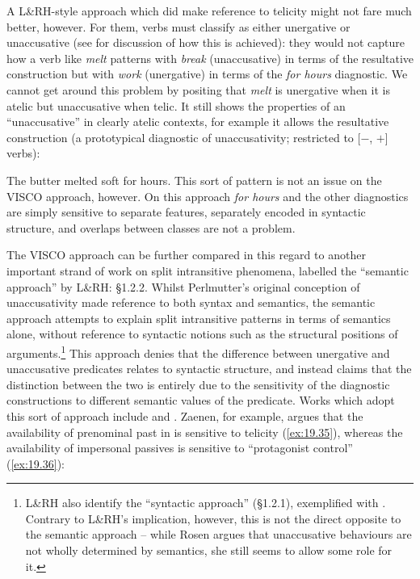 \documentclass[output=paper]{langsci/langscibook}
\begin{document}
A L\&RH-style approach which did make reference to telicity might not fare
much better, however. For them, verbs must classify as either unergative or
unaccusative (see  for discussion of how this is achieved): they
would not capture how a verb like \emph{melt} patterns with \emph{break}
(unaccusative) in terms of the resultative construction but with \emph{work}
(unergative) in terms of the \emph{for hours} diagnostic. We cannot get
around this problem by positing that \emph{melt} is unergative when it is
atelic but unaccusative when telic. It still shows the properties of an
\enquote{unaccusative} in clearly atelic contexts, for example it allows the
resultative construction (a prototypical diagnostic of unaccusativity;
restricted to [$-$\Initiation{}, $+$\Change{}] verbs):

\ea The butter melted soft for hours.
\z
This sort of pattern is not an issue on the VISCO approach, however. On this
approach \emph{for hours} and the other diagnostics are simply sensitive to
separate features, separately encoded in syntactic structure, and overlaps
between classes are not a problem.

The VISCO approach can be further compared in this regard to another important
strand of work on split intransitive phenomena, labelled the
\enquote{semantic approach} by L\&RH: §1.2.2. Whilst Perlmutter’s original
conception of unaccusativity made reference to both syntax and semantics, the
semantic approach attempts to explain split intransitive patterns in terms of
semantics alone, without reference to syntactic notions such as the structural
positions of arguments.\footnote{L\&RH also identify the \enquote{syntactic
approach} (§1.2.1), exemplified with \citet{Rosen1984}. Contrary to L\&RH’s
implication, however, this is not the direct opposite to the semantic approach
– while Rosen argues that unaccusative behaviours are not wholly determined by
semantics, she still seems to allow some role for it.}  This approach denies
that the difference between unergative and unaccusative predicates relates to
syntactic structure, and instead claims that the distinction between the two is
entirely due to the sensitivity of the diagnostic constructions to different
semantic values of the predicate. Works which adopt this sort of approach
include \citet{Valin1990} and \citet{Zaenen1993}. Zaenen, for example,
argues that the availability of prenominal past  in
 is sensitive to telicity (\ref{ex:19.35}), whereas the availability
of impersonal passives is sensitive to \enquote{protagonist control}
(\ref{ex:19.36}):
\end{document}
